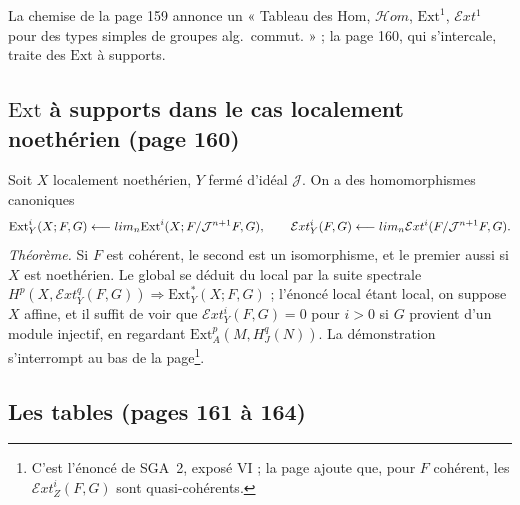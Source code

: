 \documentclass[11pt,a4paper]{article}
\begin{document}
La chemise de la page 159 annonce un « Tableau des Hom, $\mathcal{H}om$,
$\mathrm{Ext}^1$, $\mathcal{E}xt^1$ pour des types simples de groupes alg.\
commut. » ; la page 160, qui s'intercale, traite des $\mathrm{Ext}$ à supports.

\subsection*{$\mathrm{Ext}$ à supports dans le cas localement noethérien (page 160)}

Soit $X$ localement noethérien, $Y$ fermé d'idéal $\mathcal{J}$. On a des
homomorphismes canoniques
\[
\mathrm{Ext}^i_Y(X; F, G) \longleftarrow \varinjlim_n \mathrm{Ext}^i(X;
F/\mathcal{J}^{n+1}F, G),
\qquad
\mathcal{E}xt^i_Y(F, G) \longleftarrow \varinjlim_n \mathcal{E}xt^i(F/\mathcal{J}^{n+1}F,
G).
\]
\emph{Théorème.} Si $F$ est cohérent, le second est un isomorphisme, et le premier
aussi si $X$ est noethérien. Le global se déduit du local par la suite spectrale
$H^p(X, \mathcal{E}xt^q_Y(F, G)) \Rightarrow \mathrm{Ext}^{*}_Y(X; F, G)$ ;
l'énoncé local étant local, on suppose $X$ affine, et il suffit de voir que
$\mathcal{E}xt^i_Y(F, G) = 0$ pour $i > 0$ si $G$ provient d'un module injectif, en
regardant $\mathrm{Ext}^p_A(M, H^q_J(N))$. La démonstration s'interrompt au bas de
la page\footnote{C'est l'énoncé de SGA~2, exposé VI ; la page ajoute que, pour $F$
cohérent, les $\mathcal{E}xt^i_Z(F, G)$ sont quasi-cohérents.}.

\subsection*{Les tables (pages 161 à 164)}
\end{document}
